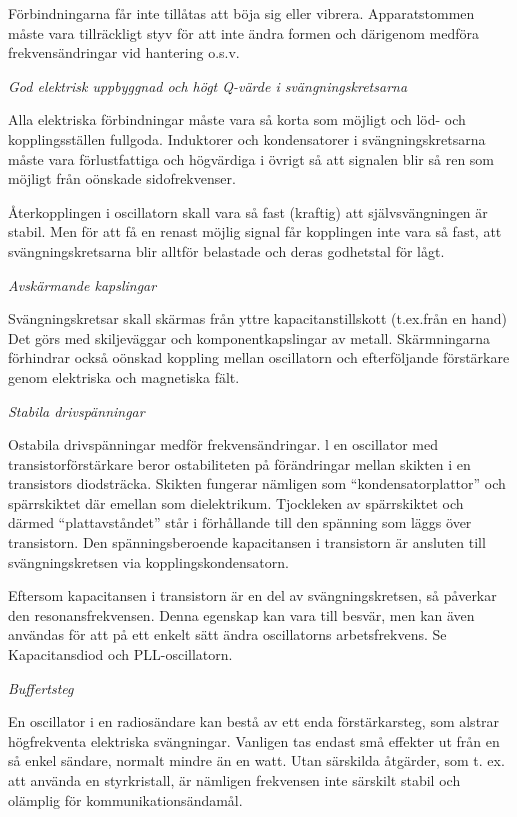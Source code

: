 Förbindningarna får inte tillåtas att böja sig eller
vibrera. Apparatstommen måste vara tillräckligt styv för att inte
ändra formen och därigenom medföra frekvensändringar vid hantering
o.s.v.

\emph{God elektrisk uppbyggnad och högt Q-värde i svängningskretsarna}

Alla elektriska förbindningar måste vara så korta som möjligt och löd-
och kopplingsställen fullgoda. Induktorer och kondensatorer i
svängningskretsarna måste vara förlustfattiga och högvärdiga i övrigt
så att signalen blir så ren som möjligt från oönskade sidofrekvenser.

Återkopplingen i oscillatorn skall vara så fast (kraftig) att
självsvängningen är stabil.  Men för att få en renast möjlig signal
får kopplingen inte vara så fast, att svängningskretsarna blir alltför
belastade och deras godhetstal för lågt.

\emph{Avskärmande kapslingar}

Svängningskretsar skall skärmas från yttre kapacitanstillskott
(t.ex.från en hand) Det görs med skiljeväggar och komponentkapslingar
av metall. Skärmningarna förhindrar också oönskad koppling mellan
oscillatorn och efterföljande förstärkare genom elektriska och
magnetiska fält.

\emph{Stabila drivspänningar}

Ostabila drivspänningar medför frekvensändringar. l en oscillator med
transistorförstärkare beror ostabiliteten på förändringar mellan
skikten i en transistors diodsträcka.  Skikten fungerar nämligen som
``kondensatorplattor'' och spärrskiktet där emellan som
dielektrikum. Tjockleken av spärrskiktet och därmed ``plattavståndet''
står i förhållande till den spänning som läggs över transistorn.  Den
spänningsberoende kapacitansen i transistorn är ansluten till
svängningskretsen via kopplingskondensatorn.

Eftersom kapacitansen i transistorn är en del av svängningskretsen, så
påverkar den resonansfrekvensen. Denna egenskap kan vara till besvär,
men kan även användas för att på ett enkelt sätt ändra oscillatorns
arbetsfrekvens.  Se Kapacitansdiod och PLL-oscillatorn.

\emph{Buffertsteg}

En oscillator i en radiosändare kan bestå av ett enda förstärkarsteg,
som alstrar högfrekventa elektriska svängningar. Vanligen tas endast
små effekter ut från en så enkel sändare, normalt mindre än en
watt. Utan särskilda åtgärder, som t. ex. att använda en styrkristall,
är nämligen frekvensen inte särskilt stabil och olämplig för
kommunikationsändamål.

